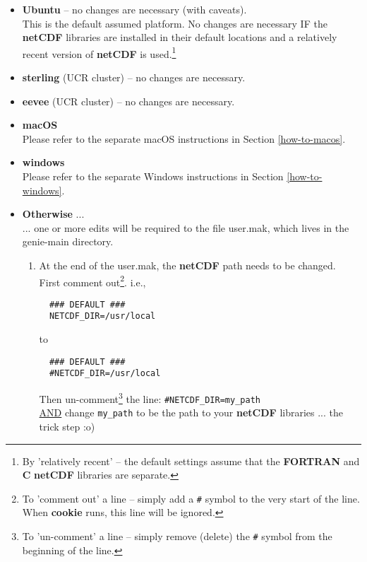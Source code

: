\begin{itemize}

\vspace{1mm}
\item \textbf{Ubuntu} -- no changes are necessary (with caveats).
\\ This is the default assumed platform. No changes are necessary IF the \textbf{netCDF} libraries are installed in their default locations and a relatively recent version of \textbf{netCDF} is used.\footnote{By 'relatively recent' -- the default settings assume that the \textbf{FORTRAN} and \textbf{C} \textbf{netCDF} libraries are separate.}

\vspace{1mm}
\item \textbf{sterling} (UCR cluster) -- no changes are necessary.

\vspace{1mm}
\item \textbf{eevee} (UCR cluster) -- no changes are necessary.

\vspace{1mm}
\item \textbf{macOS}
\\ Please refer to the separate macOS instructions in Section \ref{how-to-macos}.

\vspace{1mm}
\item \textbf{windows} 
\\ Please refer to the separate Windows instructions in Section \ref{how-to-windows}.

\vspace{1mm} 
\item \textbf{Otherwise} ...
\\... one or more edits will be required to the file \textsf{\footnotesize user.mak}, which lives in the \textsf{\small genie-main} directory.

\begin{enumerate}[noitemsep]
\vspace{2mm}
\item At the end of the \textsf{\small user.mak}, the \textbf{netCDF} path needs to be changed. 
\\First comment out\footnote{To 'comment out' a line -- simply add a \texttt{\#} symbol to the very start of the line. When \textbf{cookie} runs, this line will be ignored.}. i.e.,
\small\begin{verbatim}
  ### DEFAULT ###
  NETCDF_DIR=/usr/local
\end{verbatim}\normalsize
to
\small\begin{verbatim}
  ### DEFAULT ###
  #NETCDF_DIR=/usr/local
\end{verbatim}\normalsize
Then un-comment\footnote{To 'un-comment' a line -- simply remove (delete) the \texttt{\#} symbol from the beginning of the line.} the line: \texttt{\#NETCDF\_DIR=my\_path}
\\\uline{AND} change \texttt{my\_path} to be the path to your \textbf{netCDF} libraries ... the trick step :o)


\end{enumerate}
\end{itemize}
